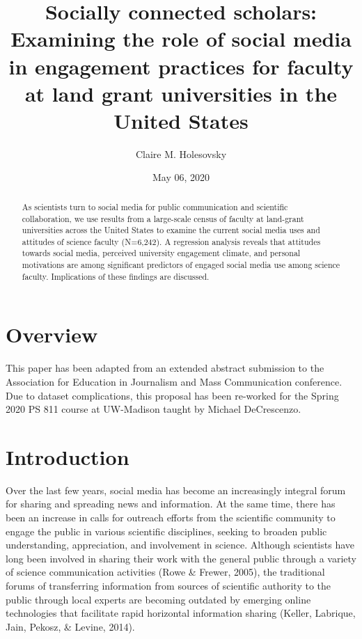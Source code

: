 \documentclass[12pt,]{article}
\title{Socially connected scholars: Examining the role of social media in engagement practices for faculty at land grant universities in the United States}
\author{Claire M. Holesovsky}
\date{May 06, 2020}
\begin{document}
\maketitle
\begin{abstract}
As scientists turn to social media for public communication and scientific collaboration, we use results from a large-scale census of faculty at land-grant universities across the United States to examine the current social media uses and attitudes of science faculty (N=6,242). A regression analysis reveals that attitudes towards social media, perceived university engagement climate, and personal motivations are among significant predictors of engaged social media use among science faculty. Implications of these findings are discussed.
\end{abstract}

{
\hypersetup{linkcolor=}
\setcounter{tocdepth}{2}
\tableofcontents
}
\hypertarget{overview}{%
\section{Overview}\label{overview}}

This paper has been adapted from an extended abstract submission to the Association for Education in Journalism and Mass Communication conference. Due to dataset complications, this proposal has been re-worked for the Spring 2020 PS 811 course at UW-Madison taught by Michael DeCrescenzo.

\hypertarget{introduction}{%
\section{Introduction}\label{introduction}}

Over the last few years, social media has become an increasingly integral forum for sharing and spreading news and information. At the same time, there has been an increase in calls for outreach efforts from the scientific community to engage the public in various scientific disciplines, seeking to broaden public understanding, appreciation, and involvement in science. Although scientists have long been involved in sharing their work with the general public through a variety of science communication activities (Rowe \& Frewer, 2005), the traditional forums of transferring information from sources of scientific authority to the public through local experts are becoming outdated by emerging online technologies that facilitate rapid horizontal information sharing (Keller, Labrique, Jain, Pekosz, \& Levine, 2014).
\end{document}
